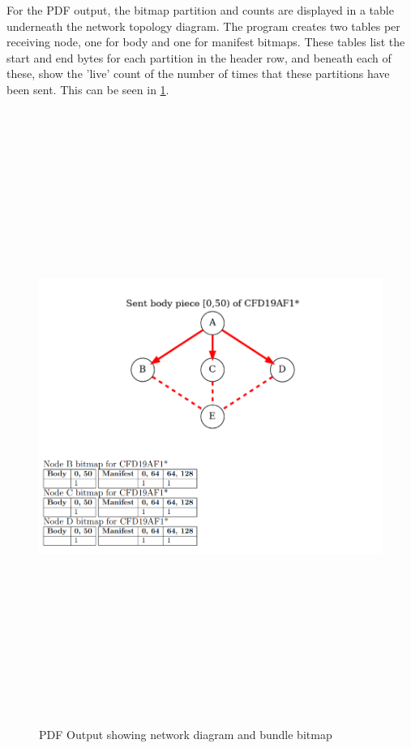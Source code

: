 For the PDF output, the bitmap partition and counts are displayed in a table underneath the network topology diagram.
The program creates two tables per receiving node, one for body and one for manifest bitmaps.
These tables list the start and end bytes for each partition in the header row, and beneath each of these, show the 'live' count of the number of times that these partitions have been sent.
This can be seen in \figurename{ \ref{fig:chapter6PDFPartition}}.

\begin{figure}
    \begin{centering}
        \includegraphics[width=15cm,height=20cm,keepaspectratio]{Figures/Chapter6-PDFPartition.png}
        \caption{PDF Output showing network diagram and bundle bitmap}
        \label{fig:chapter6PDFPartition}
    \end{centering}
\end{figure}

